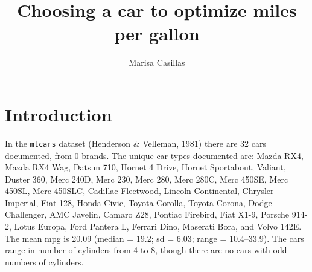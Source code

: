 \documentclass[
]{article}
\title{Choosing a car to optimize miles per gallon}
\author{Marisa Casillas}
\date{}
\begin{document}
\maketitle

\hypertarget{introduction}{%
\section{Introduction}\label{introduction}}

In the \texttt{mtcars} dataset (Henderson \& Velleman, 1981) there are 32 cars documented, from 0 brands. The unique car types documented are: Mazda RX4, Mazda RX4 Wag, Datsun 710, Hornet 4 Drive, Hornet Sportabout, Valiant, Duster 360, Merc 240D, Merc 230, Merc 280, Merc 280C, Merc 450SE, Merc 450SL, Merc 450SLC, Cadillac Fleetwood, Lincoln Continental, Chrysler Imperial, Fiat 128, Honda Civic, Toyota Corolla, Toyota Corona, Dodge Challenger, AMC Javelin, Camaro Z28, Pontiac Firebird, Fiat X1-9, Porsche 914-2, Lotus Europa, Ford Pantera L, Ferrari Dino, Maserati Bora, and Volvo 142E. The mean mpg is 20.09 (median = 19.2; sd = 6.03; range = 10.4--33.9). The cars range in number of cylinders from 4 to 8, though there are no cars with odd numbers of cylinders.
\end{document}
